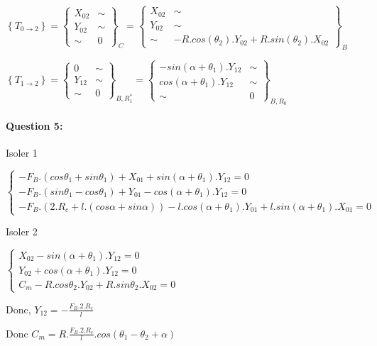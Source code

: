 $\left\{T_{0\rightarrow 2}\right\}=\left\{\begin{array}{cc}
X_{02} & \sim \\
Y_{02} & \sim \\
\sim & 0
\end{array}\right\}_C=
\left\{\begin{array}{cc}
X_{02} & \sim \\
Y_{02} & \sim \\
\sim & -R.cos(\theta_2).Y_{02}+R.sin(\theta_2).X_{02}
\end{array}\right\}_B$

$\left\{T_{1\rightarrow 2}\right\}=\left\{\begin{array}{cc}
0 & \sim \\
Y_{12} & \sim \\
\sim & 0
\end{array}\right\}_{B,R_1^*}=
\left\{\begin{array}{cc}
-sin(\alpha+\theta_1).Y_{12} & \sim \\
cos(\alpha+\theta_1).Y_{12} & \sim \\
\sim & 0
\end{array}\right\}_{B,R_0}$

\paragraph{Question 5:}

Isoler 1

$\left\{\begin{array}{l}
-F_B.(cos\theta_1+sin\theta_1)+X_{01}+sin(\alpha+\theta_1).Y_{12}=0 \\
-F_B.(sin\theta_1-cos\theta_1)+Y_{01}-cos(\alpha+\theta_1).Y_{12}=0 \\
-F_B.(2.R_c+l.(cos\alpha+sin\alpha))-l.cos(\alpha+\theta_1).Y_{01}+l.sin(\alpha+\theta_1).X_{01}=0
\end{array}\right.$

Isoler 2

$\left\{\begin{array}{l}
X_{02}-sin(\alpha+\theta_1).Y_{12}=0 \\
Y_{02}+cos(\alpha+\theta_1).Y_{12}=0 \\
C_m-R.cos\theta_2.Y_{02}+R.sin\theta_2.X_{02}=0
\end{array}\right.$

Donc, $Y_{12}=-\frac{F_B.2.R_c}{l}$

Donc $C_m=R.\frac{F_B.2.R_c}{l}.cos(\theta_1-\theta_2+\alpha)$



